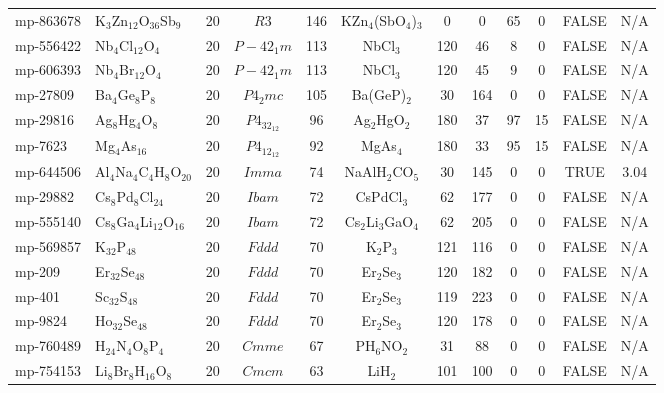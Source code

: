 {\begin{longtable}{llcccccccccc}
    mp-863678 & K$_{3}$Zn$_{12}$O$_{36}$Sb$_{9}$ & 20    & $R3$  & 146   & KZn$_{4}$(SbO$_{4}$)$_{3}$ & 0     & 0     & 65    & 0     & FALSE & N/A \\
    mp-556422 & Nb$_{4}$Cl$_{12}$O$_{4}$ & 20    & $P-42_1m$ & 113   & NbCl$_{3}$ & 120   & 46    & 8     & 0     & FALSE & N/A \\
    mp-606393 & Nb$_{4}$Br$_{12}$O$_{4}$ & 20    & $P-42_1m$ & 113   & NbCl$_{3}$ & 120   & 45    & 9     & 0     & FALSE & N/A \\
    mp-27809 & Ba$_{4}$Ge$_{8}$P$_{8}$ & 20    & $P4_2mc$ & 105   & Ba(GeP)$_{2}$ & 30    & 164   & 0     & 0     & FALSE & N/A \\
    mp-29816 & Ag$_{8}$Hg$_{4}$O$_{8}$ & 20    & $P4_32_12$ & 96    & Ag$_{2}$HgO$_{2}$ & 180   & 37    & 97    & 15    & FALSE & N/A \\
    mp-7623 & Mg$_{4}$As$_{16}$ & 20    & $P4_12_12$ & 92    & MgAs$_{4}$ & 180   & 33    & 95    & 15    & FALSE & N/A \\
    mp-644506 & Al$_{4}$Na$_{4}$C$_{4}$H$_{8}$O$_{20}$ & 20    & $Imma$ & 74    & NaAlH$_{2}$CO$_{5}$ & 30    & 145   & 0     & 0     & TRUE  & 3.04  \\
    mp-29882 & Cs$_{8}$Pd$_{8}$Cl$_{24}$ & 20    & $Ibam$ & 72    & CsPdCl$_{3}$ & 62    & 177   & 0     & 0     & FALSE & N/A \\
    mp-555140 & Cs$_{8}$Ga$_{4}$Li$_{12}$O$_{16}$ & 20    & $Ibam$ & 72    & Cs$_{2}$Li$_{3}$GaO$_{4}$ & 62    & 205   & 0     & 0     & FALSE & N/A \\
    mp-569857 & K$_{32}$P$_{48}$ & 20    & $Fddd$ & 70    & K$_{2}$P$_{3}$ & 121   & 116   & 0     & 0     & FALSE & N/A \\
    mp-209 & Er$_{32}$Se$_{48}$ & 20    & $Fddd$ & 70    & Er$_{2}$Se$_{3}$ & 120   & 182   & 0     & 0     & FALSE & N/A \\
    mp-401 & Sc$_{32}$S$_{48}$ & 20    & $Fddd$ & 70    & Er$_{2}$Se$_{3}$ & 119   & 223   & 0     & 0     & FALSE & N/A \\
    mp-9824 & Ho$_{32}$Se$_{48}$ & 20    & $Fddd$ & 70    & Er$_{2}$Se$_{3}$ & 120   & 178   & 0     & 0     & FALSE & N/A \\
    mp-760489 & H$_{24}$N$_{4}$O$_{8}$P$_{4}$ & 20    & $Cmme$ & 67    & PH$_{6}$NO$_{2}$ & 31    & 88    & 0     & 0     & FALSE & N/A \\
    mp-754153 & Li$_{8}$Br$_{8}$H$_{16}$O$_{8}$ & 20    & $Cmcm$ & 63    & LiH$_{2}$ & 101   & 100   & 0     & 0     & FALSE & N/A \\

\end{longtable}}
